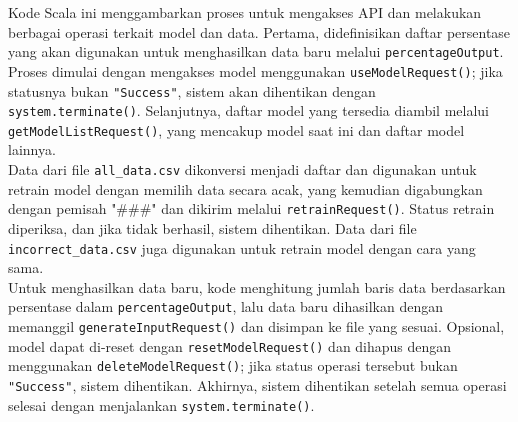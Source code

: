 \begin{enumerate}[topsep=0pt]
\begin{itemize}
      

      Kode Scala ini menggambarkan proses untuk mengakses API dan melakukan berbagai operasi terkait model dan data. Pertama, didefinisikan daftar persentase yang akan digunakan untuk menghasilkan data baru melalui \texttt{percentageOutput}. Proses dimulai dengan mengakses model menggunakan \texttt{useModelRequest()}; jika statusnya bukan \texttt{"Success"}, sistem akan dihentikan dengan \texttt{system.terminate()}. Selanjutnya, daftar model yang tersedia diambil melalui \texttt{getModelListRequest()}, yang mencakup model saat ini dan daftar model lainnya. 
      \\

      Data dari file \texttt{all\_data.csv} dikonversi menjadi daftar dan digunakan untuk retrain model dengan memilih data secara acak, yang kemudian digabungkan dengan pemisah "\#\#\#" dan dikirim melalui \texttt{retrainRequest()}. Status retrain diperiksa, dan jika tidak berhasil, sistem dihentikan. Data dari file \texttt{incorrect\_data.csv} juga digunakan untuk retrain model dengan cara yang sama. 
      \\
      
      Untuk menghasilkan data baru, kode menghitung jumlah baris data berdasarkan persentase dalam \texttt{percentageOutput}, lalu data baru dihasilkan dengan memanggil \texttt{generateInputRequest()} dan disimpan ke file yang sesuai. Opsional, model dapat di-reset dengan \texttt{resetModelRequest()} dan dihapus dengan menggunakan \texttt{deleteModelRequest()}; jika status operasi tersebut bukan \texttt{"Success"}, sistem dihentikan. Akhirnya, sistem dihentikan setelah semua operasi selesai dengan menjalankan \texttt{system.terminate()}.

      
  \end{itemize}
\end{enumerate}

